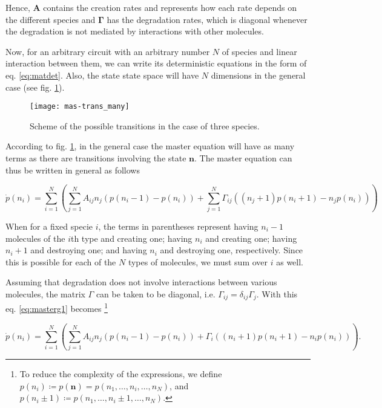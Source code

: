 Hence, $\mathbf{A}$ contains the creation rates and represents how each rate depends on the different species and $\mathbf{\Gamma}$ has the degradation rates, which is diagonal whenever the degradation is not mediated by interactions with other molecules.

Now, for an arbitrary circuit with an arbitrary number $N$ of species and linear interaction between them, we can write its deterministic equations in the form of eq. \ref{eq:matdet}. Also, the state state space will have $N$ dimensions in the general case (see fig. \ref{fig:mas-trans_many}).

\begin{figure}[H]
  \centering
  \texttt{[image: mas-trans\_many]}
  \caption[Transitions between states in general] {\label{fig:mas-trans_many} Scheme of the possible transitions in the case of three species.}
\end{figure}

According to fig. \ref{fig:mas-trans_many}, in the general case the master equation will have as many terms as there are transitions involving the state $\mathbf{n}$. The master equation can thus be written in general as follows

\begin{equation}
\label{eq:masterg1}
\dot{p}(n_i) =  \sum_{i=1}^N\left(\sum_{j=1}^N A_{ij}n_j \left( p(n_i-1) - p(n_i) \right) + \sum_{j=1}^N \Gamma_{ij}((n_j+1)p(n_i+1)-n_jp(n_i))\right)
\end{equation}

When for a fixed specie $i$, the terms in parentheses represent having $n_i-1$ molecules of the $i$th type and creating one; having $n_i$ and creating one; having $n_i+1$ and destroying one; and having $n_i$ and destroying one, respectively. Since this is possible for each of the $N$ types of molecules, we must sum over $i$ as well.

Assuming that degradation does not involve interactions between various molecules, the matrix $\Gamma$ can be taken to be diagonal, i.e. $\Gamma_{ij}=\delta_{ij}\Gamma_j$. With this eq. \ref{eq:masterg1} becomes \footnote{To reduce the complexity of the expressions, we define $p(n_i) \coloneqq p(\mathbf{n}) = p(n_1,\dotsc,n_i,\dotsc,n_N)$, and $p(n_i\pm1)\coloneqq p(n_1,\dotsc,n_i\pm1,\dotsc,n_N)$.}

\begin{equation}
\label{eq:masterg2}
\dot{p}(n_i) =  \sum_{i=1}^N\left(\sum_{j=1}^N A_{ij}n_j \left( p(n_i-1) - p(n_i) \right) + \Gamma_{i}((n_i+1)p(n_i+1)-n_ip(n_i))\right).
\end{equation}

